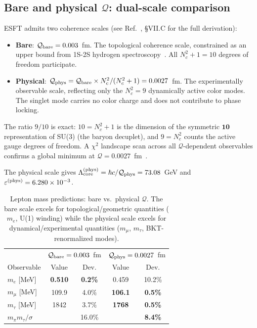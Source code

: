 ﻿\documentclass[twocolumn,preprintnumbers,amsmath,amssymb]{revtex4-2}
\newcommand{\Qoppa}{\mathcal{Q}}
\begin{document}
\subsection{Bare and physical $\Qoppa$: dual-scale comparison}
\label{sec:bare_physical}

ESFT admits two coherence scales (see Ref.~\cite{Paper12}, \S VII.C for the full derivation):
\begin{itemize}
\item \textbf{Bare}: $\Qoppa_{\rm bare} = 0.003$~fm. The topological coherence scale, constrained as an upper bound from 1S-2S hydrogen spectroscopy~\cite{Paper1}. All $N_c^2 + 1 = 10$ degrees of freedom participate.
\item \textbf{Physical}: $\Qoppa_{\rm phys} = \Qoppa_{\rm bare} \times N_c^2/(N_c^2+1) = 0.0027$~fm. The experimentally observable scale, reflecting only the $N_c^2 = 9$ dynamically active color modes. The singlet mode carries no color charge and does not contribute to phase locking.
\end{itemize}

The ratio $9/10$ is exact: $10 = N_c^2 + 1$ is the dimension of the symmetric $\mathbf{10}$ representation of SU(3) (the baryon decuplet), and $9 = N_c^2$ counts the active gauge degrees of freedom. A $\chi^2$ landscape scan across all $\Qoppa$-dependent observables confirms a global minimum at $\Qoppa = 0.0027$~fm~\cite{Paper12}.

The physical scale gives $\Lambda_{\rm core}^{(\rm phys)} = \hbar c/\Qoppa_{\rm phys} = 73.08$~GeV and $\varepsilon^{(\rm phys)} = 6.280 \times 10^{-3}$.

\begin{table}[h]
\caption{Lepton mass predictions: bare vs.\ physical $\Qoppa$. The bare scale excels for topological/geometric quantities ($m_e$, U(1) winding) while the physical scale excels for dynamical/experimental quantities ($m_\mu$, $m_\tau$, BKT-renormalized modes).}
\label{tab:bare_phys}
\begin{ruledtabular}
\begin{tabular}{lcccc}
& \multicolumn{2}{c}{$\Qoppa_{\rm bare} = 0.003$~fm} & \multicolumn{2}{c}{$\Qoppa_{\rm phys} = 0.0027$~fm} \\
Observable & Value & Dev. & Value & Dev. \\
\hline
$m_e$ [MeV] & \textbf{0.510} & \textbf{0.2\%} & 0.459 & 10.2\% \\
$m_\mu$ [MeV] & 109.9 & 4.0\% & \textbf{106.1} & \textbf{0.5\%} \\
$m_\tau$ [MeV] & 1842 & 3.7\% & \textbf{1768} & \textbf{0.5\%} \\
$m_\pi m_\tau/\sigma$ & & 16.0\% & & \textbf{8.4\%} \\
\end{tabular}
\end{ruledtabular}
\end{table}
\end{document}
